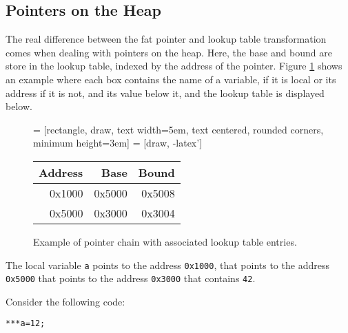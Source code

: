 \subsection{Pointers on the Heap}

The real difference between the fat pointer and lookup table transformation comes when dealing with pointers on the heap.
Here, the base and bound are store in the lookup table, indexed by the address of the pointer.
Figure \ref{fig:PtrChain} shows an example where each box contains the name of a variable, if it is local or its address if it is not, and its value below it, and the lookup table is displayed below. 

\begin{figure}
\centering
{} = [rectangle, draw, 
    text width=5em, text centered, rounded corners, minimum height=3em]
     = [draw, -latex']
\newline
\vspace{5mm}
\newline
\begin{tabular}{|r|r|r|}
\hline Address & Base & Bound \\
\hline 0x1000 & 0x5000 & 0x5008 \\
\hline 0x5000 & 0x3000 & 0x3004 \\
\hline
\end{tabular}
\caption{Example of pointer chain with associated lookup table entries.}
\label{fig:PtrChain}
\end{figure}

The local variable \verb!a! points to the address \verb!0x1000!, that points to the address \verb!0x5000! that points to the address \verb!0x3000! that contains \verb!42!.

Consider the following code:

\begin{verbatim}
***a=12;
\end{verbatim}


